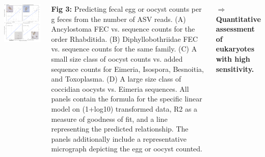 \documentclass[30pt, a0paper, portrait, margin=0mm, innermargin=15mm,
               blockverticalspace=15mm, colspace=15mm, subcolspace=8mm]{tikzposter}
\begin{document}
\begin{columns}
      
      {
        \begin{minipage}{0.5\linewidth}                  
          \begin{left}
            \includegraphics[scale=0.5]{Figure2_man.png}
          \end{left}
        \end{minipage}
        \hfill
        \begin{minipage}{0.5\linewidth}
          \textbf{Fig 3:} Predicting fecal egg or oocyst counts per g
          feces from the number of ASV reads. (A) Ancylostoma FEC
          vs. sequence counts for the order Rhabditida. (B)
          Diphyllobothriidae FEC vs. sequence counts for the same
          family. (C) A small size class of oocyst counts vs. added
          sequence counts for Eimeria, Isospora, Besnoitia, and
          Toxoplasma. (D) A large size class of coccidian oocysts
          vs. Eimeria sequences. All panels contain the formula for
          the specific linear model on (1+log10) transformed data, R2
          as a measure of goodness of fit, and a line representing the
          predicted relationship. The panels additionally include a
          representative micrograph depicting the egg or oocyst
          counted.\\
        \end{minipage}
        $\Rightarrow$ \textbf{Quantitative assessment of eukaryotes with high
        sensitivity.}
      }


\end{columns}
\end{document}
